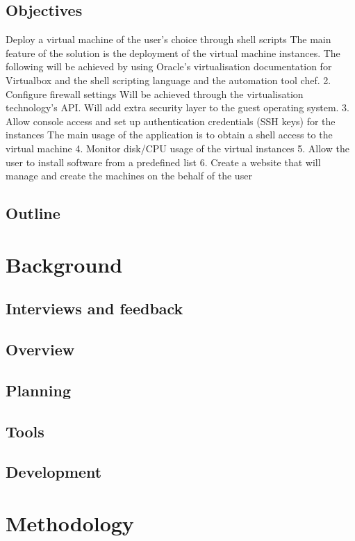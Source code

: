 \documentclass{article}
\begin{document}
	  \subsection{Objectives}
	  Deploy a virtual machine of the user's choice through shell scripts The main feature of the solution is the deployment of the virtual machine instances. The
	  following will be achieved by using Oracle's virtualisation documentation for Virtualbox and
	  the shell scripting language and the automation tool chef.
	  2. Configure firewall settings
	  Will be achieved through the virtualisation technology's API. Will add extra security layer to
	  the guest operating system.
	  3. Allow console access and set up authentication credentials (SSH keys) for the instances
	  The main usage of the application is to obtain a shell access to the virtual machine
	  4. Monitor disk/CPU usage of the virtual instances
	  5. Allow the user to install software from a predefined list
	  6. Create a website that will manage and create the machines on the behalf of the user
  \subsection{Outline}

  \newpage
  \section{Background}
  \subsection{Interviews and feedback}

  \subsection{Overview}
  \subsection{Planning}
  \subsection{Tools}
  \subsection{Development}

  \newpage
  \section{Methodology}
\end{document}
